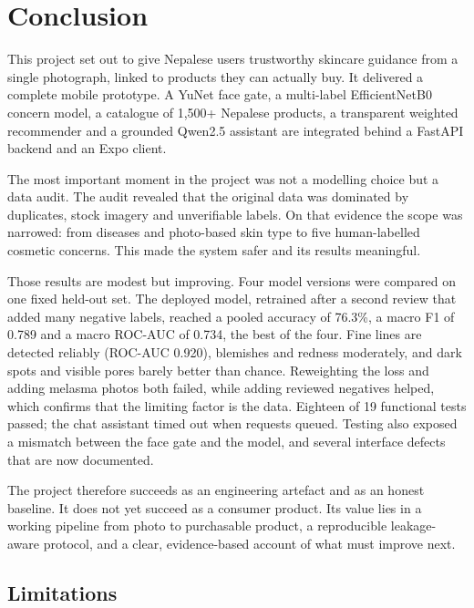 \section{Conclusion}
\label{sec:conclusion}

This project set out to give Nepalese users trustworthy skincare guidance from a single photograph, linked to products they can actually buy. It delivered a complete mobile prototype. A YuNet face gate, a multi-label EfficientNetB0 concern model, a catalogue of 1,500+ Nepalese products, a transparent weighted recommender and a grounded Qwen2.5 assistant are integrated behind a FastAPI backend and an Expo client.

The most important moment in the project was not a modelling choice but a data audit. The audit revealed that the original data was dominated by duplicates, stock imagery and unverifiable labels. On that evidence the scope was narrowed: from diseases and photo-based skin type to five human-labelled cosmetic concerns. This made the system safer and its results meaningful.

Those results are modest but improving. Four model versions were compared on one fixed held-out set. The deployed model, retrained after a second review that added many negative labels, reached a pooled accuracy of 76.3\%, a macro F1 of 0.789 and a macro ROC-AUC of 0.734, the best of the four. Fine lines are detected reliably (ROC-AUC 0.920), blemishes and redness moderately, and dark spots and visible pores barely better than chance. Reweighting the loss and adding melasma photos both failed, while adding reviewed negatives helped, which confirms that the limiting factor is the data. Eighteen of 19 functional tests passed; the chat assistant timed out when requests queued. Testing also exposed a mismatch between the face gate and the model, and several interface defects that are now documented.

The project therefore succeeds as an engineering artefact and as an honest baseline. It does not yet succeed as a consumer product. Its value lies in a working pipeline from photo to purchasable product, a reproducible leakage-aware protocol, and a clear, evidence-based account of what must improve next.

\subsection{Limitations}

